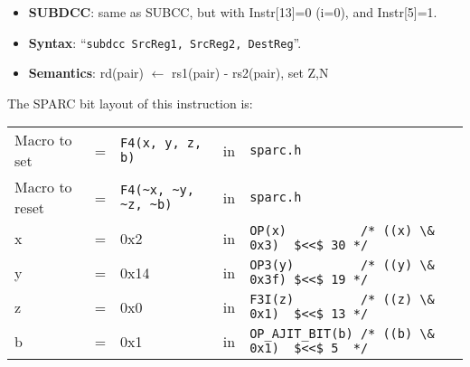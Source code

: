 \begin{enumerate}
  \begin{itemize}
  \item []\textbf{SUBDCC}: same as SUBCC, but with Instr[13]=0 (i=0), and
    Instr[5]=1.
  \item []\textbf{Syntax}: ``\texttt{subdcc  SrcReg1, SrcReg2, DestReg}''.
  \item []\textbf{Semantics}: rd(pair) $\leftarrow$ rs1(pair) - rs2(pair), set Z,N
  \end{itemize}

  The SPARC bit layout of this instruction is:

  \begin{tabular}[h]{lclcl}
    Macro to set   &=&  \verb|F4(x, y, z, b)|     &in& \verb|sparc.h|     \\
    Macro to reset &=&  \verb|F4(~x, ~y, ~z, ~b)| &in& \verb|sparc.h|     \\
    x &=& 0x2      &in& \verb|OP(x)          /* ((x) \& 0x3)  $<<$ 30 */| \\
    y &=& 0x14     &in& \verb|OP3(y)         /* ((y) \& 0x3f) $<<$ 19 */| \\
    z &=& 0x0      &in& \verb|F3I(z)         /* ((z) \& 0x1)  $<<$ 13 */| \\
    b &=& 0x1      &in& \verb|OP_AJIT_BIT(b) /* ((b) \& 0x1)  $<<$ 5  */|
  \end{tabular}
\end{enumerate}
